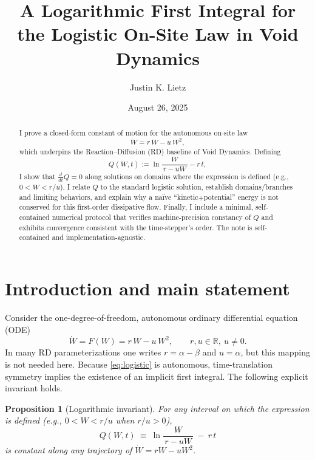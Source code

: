 \documentclass[11pt]{article}
\title{A Logarithmic First Integral for the Logistic On-Site Law in Void Dynamics}
\author{Justin K. Lietz}
\date{August 26, 2025}
\newtheorem{prop}{Proposition}
\begin{document}
\maketitle

\begin{abstract}
I prove a closed-form constant of motion for the autonomous on-site law
\[
\dot W = r\,W - u\,W^2,
\]
which underpins the Reaction--Diffusion (RD) baseline of Void Dynamics. Defining
\[
Q(W,t) := \ln\!\frac{W}{\,r-uW\,} - r\,t,
\]
I show that $\tfrac{d}{dt}Q=0$ along solutions on domains where the expression is defined (e.g., $0<W<r/u$). I relate $Q$ to the standard logistic solution, establish domains/branches and limiting behaviors, and explain why a na\"{i}ve ``kinetic$+$potential'' energy is not conserved for this first-order dissipative flow. Finally, I include a minimal, self-contained numerical protocol that verifies machine-precision constancy of $Q$ and exhibits convergence consistent with the time-stepper's order. The note is self-contained and implementation-agnostic.
\end{abstract}

\section{Introduction and main statement}
Consider the one-degree-of-freedom, autonomous ordinary differential equation (ODE)
\begin{equation}
\dot W = F(W) = r\,W - u\,W^2,\qquad r,u\in\mathbb{R},\ u\neq 0.
\label{eq:logistic}
\end{equation}
In many RD parameterizations one writes $r=\alpha-\beta$ and $u=\alpha$, but this mapping is not needed here. Because \eqref{eq:logistic} is autonomous, time-translation symmetry implies the existence of an implicit first integral. The following explicit invariant holds.

\begin{prop}[Logarithmic invariant]
For any interval on which the expression is defined (e.g., $0<W<r/u$ when $r/u>0$),
\begin{equation}
Q(W,t)\ \equiv\ \ln\!\frac{W}{\,r-uW\,}\ -\ r\,t
\label{eq:Q}
\end{equation}
is constant along any trajectory of $\dot W = rW - uW^2$.
\end{prop}
\end{document}
